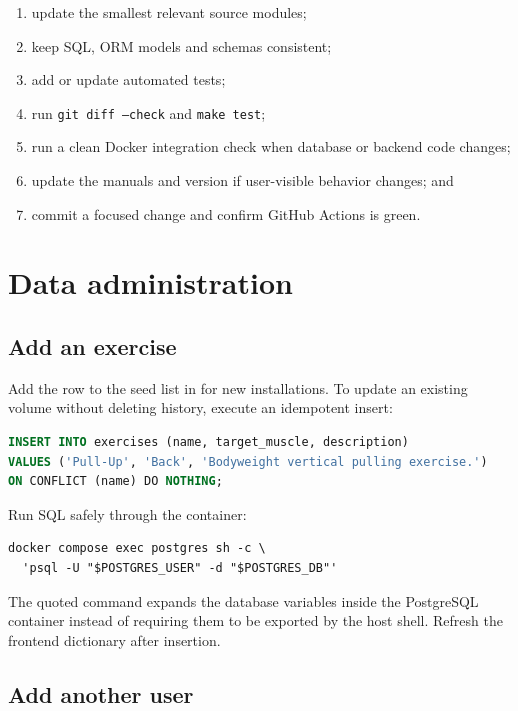 \documentclass[11pt,a4paper]{article}
\newcommand{\filepath}[1]{\path{#1}}
\begin{document}
\begin{enumerate}
  \item update the smallest relevant source modules;
  \item keep SQL, ORM models and schemas consistent;
  \item add or update automated tests;
  \item run \texttt{git diff --check} and \texttt{make test};
  \item run a clean Docker integration check when database or backend code changes;
  \item update the manuals and version if user-visible behavior changes; and
  \item commit a focused change and confirm GitHub Actions is green.
\end{enumerate}

\section{Data administration}

\subsection{Add an exercise}

Add the row to the seed list in \filepath{init.sql} for new installations. To
update an existing volume without deleting history, execute an idempotent
insert:

\begin{lstlisting}[language=SQL]
INSERT INTO exercises (name, target_muscle, description)
VALUES ('Pull-Up', 'Back', 'Bodyweight vertical pulling exercise.')
ON CONFLICT (name) DO NOTHING;
\end{lstlisting}

Run SQL safely through the container:

\begin{lstlisting}
docker compose exec postgres sh -c \
  'psql -U "$POSTGRES_USER" -d "$POSTGRES_DB"'
\end{lstlisting}

The quoted command expands the database variables inside the PostgreSQL
container instead of requiring them to be exported by the host shell. Refresh
the frontend dictionary after insertion.

\subsection{Add another user}
\end{document}
